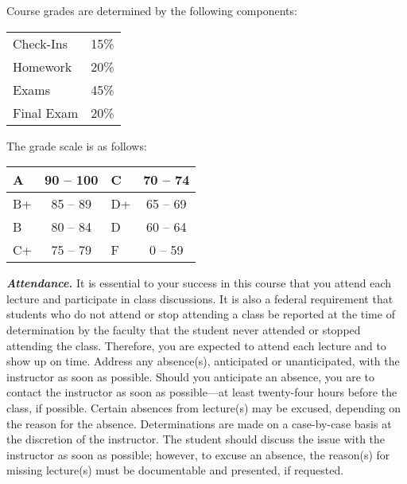 \documentclass[11pt,letterpaper]{article}
\begin{document}



Course grades are determined by the following components: \par
	\begin{table}[!ht]
        \begin{tabular}{lr}
	Check-Ins & 15\% \\
        Homework & 20\% \\
        Exams & 45\% \\
        Final Exam & 20\% \\
        \end{tabular} 
        \end{table}
\sectionbreak




The grade scale is as follows: \par
        \begin{table}[!ht]
        \centering
        \begin{tabular}{|l||c|l||c|} \hline
        A & 90 -- 100 & C & 70 -- 74 \\ \hline
        B+ & 85 -- 89 & D+ & 65 -- 69 \\ \hline
        B & 80 -- 84 & D & 60 -- 64 \\ \hline
        C+ & 75 -- 79 & F & 0 -- 59 \\ \hline
        \end{tabular}
        \end{table} 
\sectionbreak





\newpage






{\itshape\bfseries\color{scred}Attendance.} It is essential to your success in this course that you attend each lecture and participate in class discussions. It is also a federal requirement that students who do not attend or stop attending a class be reported at the time of determination by the faculty that the student never attended or stopped attending the class. Therefore, you are expected to attend each lecture and to show up on time. Address any absence(s), anticipated or unanticipated, with the instructor as soon as possible. Should you anticipate an absence, you are to contact the instructor as soon as possible---at least twenty-four hours before the class, if possible. Certain absences from lecture(s) may be excused, depending on the reason for the absence. Determinations are made on a case-by-case basis at the discretion of the instructor. The student should discuss the issue with the instructor as soon as possible; however, to excuse an absence, the reason(s) for missing lecture(s) must be documentable and presented, if requested. \pspace
\end{document}
